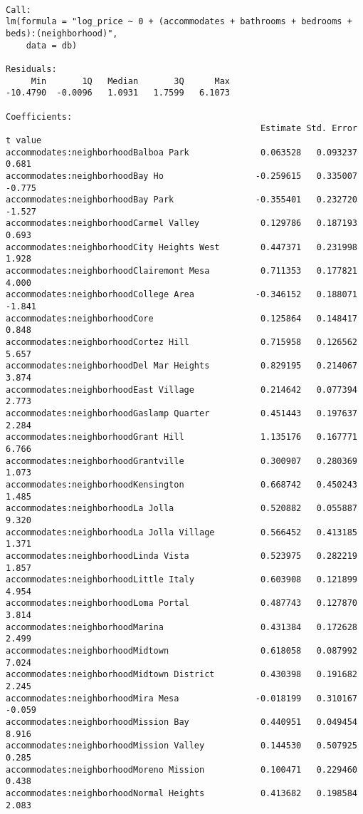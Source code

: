\documentclass[
  letterpaper,
  krantz2]{style/krantz}
\begin{document}
\begin{verbatim}

Call:
lm(formula = "log_price ~ 0 + (accommodates + bathrooms + bedrooms + beds):(neighborhood)", 
    data = db)

Residuals:
     Min       1Q   Median       3Q      Max 
-10.4790  -0.0096   1.0931   1.7599   6.1073 

Coefficients:
                                                  Estimate Std. Error t value
accommodates:neighborhoodBalboa Park              0.063528   0.093237   0.681
accommodates:neighborhoodBay Ho                  -0.259615   0.335007  -0.775
accommodates:neighborhoodBay Park                -0.355401   0.232720  -1.527
accommodates:neighborhoodCarmel Valley            0.129786   0.187193   0.693
accommodates:neighborhoodCity Heights West        0.447371   0.231998   1.928
accommodates:neighborhoodClairemont Mesa          0.711353   0.177821   4.000
accommodates:neighborhoodCollege Area            -0.346152   0.188071  -1.841
accommodates:neighborhoodCore                     0.125864   0.148417   0.848
accommodates:neighborhoodCortez Hill              0.715958   0.126562   5.657
accommodates:neighborhoodDel Mar Heights          0.829195   0.214067   3.874
accommodates:neighborhoodEast Village             0.214642   0.077394   2.773
accommodates:neighborhoodGaslamp Quarter          0.451443   0.197637   2.284
accommodates:neighborhoodGrant Hill               1.135176   0.167771   6.766
accommodates:neighborhoodGrantville               0.300907   0.280369   1.073
accommodates:neighborhoodKensington               0.668742   0.450243   1.485
accommodates:neighborhoodLa Jolla                 0.520882   0.055887   9.320
accommodates:neighborhoodLa Jolla Village         0.566452   0.413185   1.371
accommodates:neighborhoodLinda Vista              0.523975   0.282219   1.857
accommodates:neighborhoodLittle Italy             0.603908   0.121899   4.954
accommodates:neighborhoodLoma Portal              0.487743   0.127870   3.814
accommodates:neighborhoodMarina                   0.431384   0.172628   2.499
accommodates:neighborhoodMidtown                  0.618058   0.087992   7.024
accommodates:neighborhoodMidtown District         0.430398   0.191682   2.245
accommodates:neighborhoodMira Mesa               -0.018199   0.310167  -0.059
accommodates:neighborhoodMission Bay              0.440951   0.049454   8.916
accommodates:neighborhoodMission Valley           0.144530   0.507925   0.285
accommodates:neighborhoodMoreno Mission           0.100471   0.229460   0.438
accommodates:neighborhoodNormal Heights           0.413682   0.198584   2.083

\end{verbatim}
\end{document}
